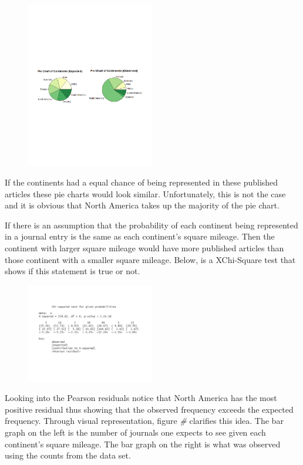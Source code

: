 \documentclass[
]{article}
\begin{document}
\begin{figure}
    \centering
    \includegraphics[width=0.50\textwidth]{ContinentPieChart.pdf}
    \label{fig:Continent Pie Chart}
\end{figure}

If the continents had a equal chance of being represented in these
published articles these pie charts would look similar. Unfortunately,
this is not the case and it is obvious that North America takes up the
majority of the pie chart.

If there is an assumption that the probability of each continent being
represented in a journal entry is the same as each continent's square
mileage. Then the continent with larger square mileage would have more
published articles than those continent with a smaller square mileage.
Below, is a XChi-Square test that shows if this statement is true or
not.

\begin{figure}
    \centering
    \includegraphics[width=0.50\textwidth]{ContinentChiSquare2.pdf}
    \label{fig:Continent XChi-Square}
\end{figure}

Looking into the Pearson residuals notice that North America has the
most positive residual thus showing that the observed frequency exceeds
the expected frequency. Through visual representation, figure \emph{\#}
clarifies this idea. The bar graph on the left is the number of journals
one expects to see given each continent's square mileage. The bar graph
on the right is what was observed using the counts from the data set.
\end{document}
